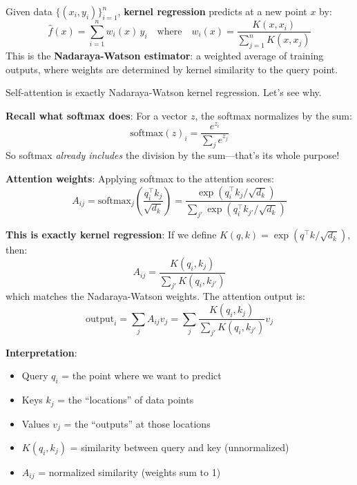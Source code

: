 \begin{definition}
    Given data $\{(x_i, y_i)\}_{i=1}^n$, \textbf{kernel regression} predicts at a new point $x$ by:
    \[
        \hat{f}(x) = \sum_{i=1}^{n} w_i(x) \, y_i \quad \text{where} \quad w_i(x) = \frac{K(x, x_i)}{\sum_{j=1}^n K(x, x_j)}
    \]
    This is the \textbf{Nadaraya-Watson estimator}: a weighted average of training outputs, where weights are determined by kernel similarity to the query point.
\end{definition}

\begin{remark}
    Self-attention is exactly Nadaraya-Watson kernel regression. Let's see why.

    \textbf{Recall what softmax does}: For a vector $z$, the softmax normalizes by the sum:
    \[
        \text{softmax}(z)_i = \frac{e^{z_i}}{\sum_{j} e^{z_j}}
    \]
    So softmax \emph{already includes} the division by the sum---that's its whole purpose!

    \textbf{Attention weights}: Applying softmax to the attention scores:
    \[
        A_{ij} = \text{softmax}_j\left(\frac{q_i^\top k_j}{\sqrt{d_k}}\right) = \frac{\exp(q_i^\top k_j / \sqrt{d_k})}{\sum_{j'} \exp(q_i^\top k_{j'} / \sqrt{d_k})}
    \]

    \textbf{This is exactly kernel regression}: If we define $K(q, k) = \exp(q^\top k / \sqrt{d_k})$, then:
    \[
        A_{ij} = \frac{K(q_i, k_j)}{\sum_{j'} K(q_i, k_{j'})}
    \]
    which matches the Nadaraya-Watson weights. The attention output is:
    \[
        \text{output}_i = \sum_j A_{ij} v_j = \sum_j \frac{K(q_i, k_j)}{\sum_{j'} K(q_i, k_{j'})} v_j
    \]

    \textbf{Interpretation}:
    \begin{itemize}
        \item Query $q_i$ = the point where we want to predict
        \item Keys $k_j$ = the ``locations'' of data points
        \item Values $v_j$ = the ``outputs'' at those locations
        \item $K(q_i, k_j)$ = similarity between query and key (unnormalized)
        \item $A_{ij}$ = normalized similarity (weights sum to 1)
    \end{itemize}
\end{remark}

